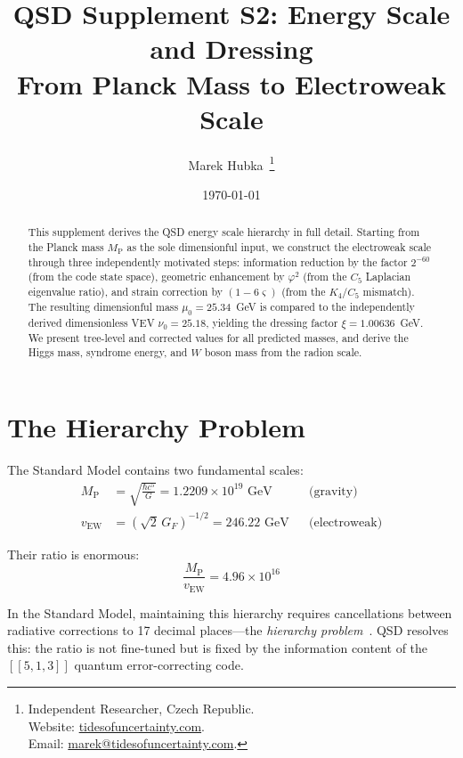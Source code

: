 \documentclass[11pt,a4paper]{article}
\title{
  \textbf{QSD Supplement S2: Energy Scale and Dressing}\\[0.5em]
  \Large From Planck Mass to Electroweak Scale\\[1em]
}
\author{
  Marek Hubka\, \orcidlink{0009-0003-2476-9017}
  \thanks{
    Independent Researcher, Czech Republic.\\
    Website: \href{http://www.tidesofuncertainty.com}{tidesofuncertainty.com}.\\
    Email: \href{mailto:marek@tidesofuncertainty.com}{marek@tidesofuncertainty.com}.
  }
}
\date{\today}
\theoremstyle{definition}
\theoremstyle{remark}
\newcommand{\gr}{\varphi}
\newcommand{\gs}{\varsigma}
\newcommand{\murad}{\mu_0}
\newcommand{\nurad}{\nu_0}
\newcommand{\Mpl}{M_{\mathrm{P}}}
\begin{document}
\maketitle

\begin{abstract}
\noindent This supplement derives the QSD energy scale hierarchy in full detail. Starting from the Planck mass $\Mpl$ as the sole dimensionful input, we construct the electroweak scale through three independently motivated steps: information reduction by the factor $2^{-60}$ (from the code state space), geometric enhancement by $\gr^2$ (from the $C_5$ Laplacian eigenvalue ratio), and strain correction by $(1-6\gs)$ (from the $K_4/C_5$ mismatch). The resulting dimensionful mass $\murad = 25.34$~GeV is compared to the independently derived dimensionless VEV $\nurad = 25.18$, yielding the dressing factor $\xi = 1.00636$~GeV. We present tree-level and corrected values for all predicted masses, and derive the Higgs mass, syndrome energy, and $W$ boson mass from the radion scale.
\end{abstract}

\tableofcontents
\newpage

\section{The Hierarchy Problem}
\label{sec:problem}

The Standard Model contains two fundamental scales:
\begin{align}
\Mpl &= \sqrt{\frac{\hbar c^5}{G}} = 1.2209 \times 10^{19} \text{ GeV} &&\text{(gravity)} \\
v_{\mathrm{EW}} &= (\sqrt{2}\,G_F)^{-1/2} = 246.22 \text{ GeV} &&\text{(electroweak)}
\end{align}

Their ratio is enormous:
\begin{equation}
\frac{\Mpl}{v_{\mathrm{EW}}} = 4.96 \times 10^{16}
\end{equation}

In the Standard Model, maintaining this hierarchy requires cancellations between radiative corrections to 17 decimal places---the \emph{hierarchy problem}~\cite{Dirac1937, PDG2022}. QSD resolves this: the ratio is not fine-tuned but is fixed by the information content of the $[[5,1,3]]$ quantum error-correcting code.
\end{document}
